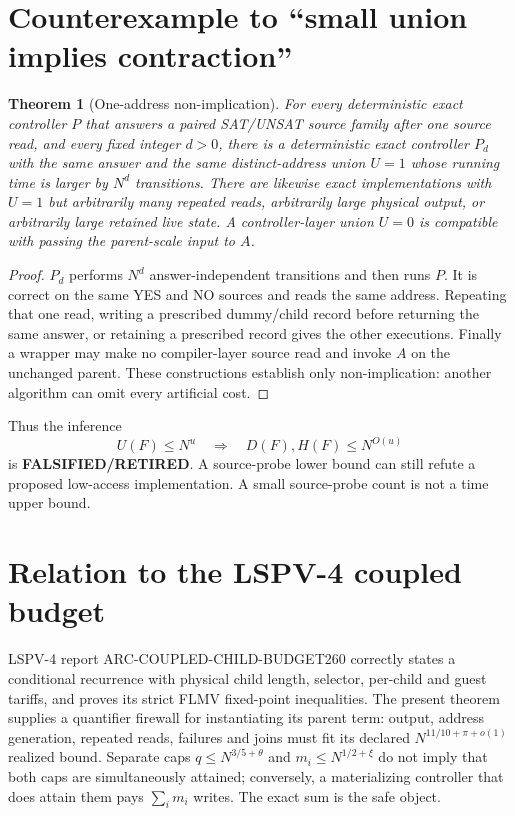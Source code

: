 \documentclass[11pt]{article}
\newtheorem{theorem}{Theorem}
\newcommand{\RET}{\textbf{FALSIFIED/RETIRED}}
\begin{document}
\section{Counterexample to ``small union implies contraction''}
\begin{theorem}[One-address non-implication]\label{thm:counter}
For every deterministic exact controller $P$ that answers a paired SAT/UNSAT
source family after one source read, and every fixed integer $d>0$, there is a
deterministic exact controller $P_d$ with the same answer and the same
distinct-address union $U=1$ whose running time is larger by $N^d$ transitions.
There are likewise exact implementations with $U=1$ but arbitrarily many
repeated reads, arbitrarily large physical output, or arbitrarily large retained
live state.  A controller-layer union $U=0$ is compatible with passing the
parent-scale input to $A$.
\end{theorem}
\begin{proof}
$P_d$ performs $N^d$ answer-independent transitions and then runs $P$.  It is
correct on the same YES and NO sources and reads the same address.  Repeating
that one read, writing a prescribed dummy/child record before returning the
same answer, or retaining a prescribed record gives the other executions.
Finally a wrapper may make no compiler-layer source read and invoke $A$ on the
unchanged parent.  These constructions establish only non-implication: another
algorithm can omit every artificial cost.
\end{proof}

Thus the inference
\[
U(F)\le N^u\quad\Longrightarrow\quad
D(F),H(F)\le N^{O(u)}
\]
is \RET.  A source-probe lower bound can still refute a proposed low-access
implementation.  A small source-probe count is not a time upper bound.

\section{Relation to the LSPV-4 coupled budget}
LSPV-4 report ARC-COUPLED-CHILD-BUDGET260 correctly states a conditional
recurrence with physical child length, selector, per-child and guest tariffs,
and proves its strict FLMV fixed-point inequalities.  The present theorem
supplies a quantifier firewall for instantiating its parent term: output,
address generation, repeated reads, failures and joins must fit its declared
$N^{11/10+\pi+o(1)}$ realized bound.  Separate caps
$q\le N^{3/5+\theta}$ and $m_i\le N^{1/2+\xi}$ do not imply that both caps are
simultaneously attained; conversely, a materializing controller that does
attain them pays $\sum_i m_i$ writes.  The exact sum is the safe object.
\end{document}
